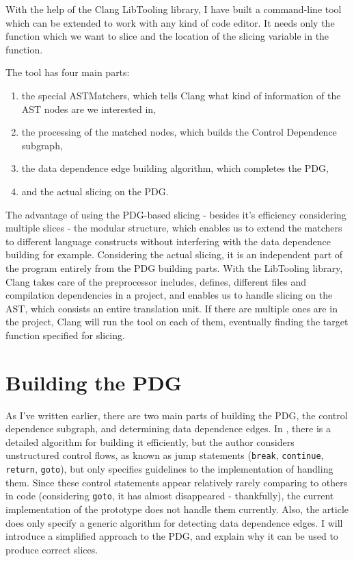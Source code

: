 \documentclass[oneside,12pt,a4paper]{book}
\begin{document}
With the help of the Clang LibTooling library, I have built a command-line tool which can be extended to work with any kind of code editor. It needs only the function which we want to slice and the location of the slicing variable in the function. 

The tool has four main parts: 
\begin{enumerate}
\item the special ASTMatchers, which tells Clang what kind of information of the AST nodes are we interested in,
\item the processing of the matched nodes, which builds the Control Dependence subgraph,
\item the data dependence edge building algorithm, which completes the PDG,
\item and the actual slicing on the PDG.
\end{enumerate}

The advantage of using the PDG-based slicing - besides it's efficiency considering multiple slices - the modular structure, which enables us to extend the matchers to different language constructs without interfering with the data dependence building for example. Considering the actual slicing, it is an independent part of the program entirely from the PDG building parts. With the LibTooling library, Clang takes care of the preprocessor includes, defines, different files and compilation dependencies in a project, and enables us to handle slicing on the AST, which consists an entire translation unit. If there are multiple ones are in the project, Clang will run the tool on each of them, eventually finding the target function specified for slicing.

\section{Building the PDG}

As I've written earlier, there are two main parts of building the PDG, the control dependence subgraph, and determining data dependence edges. In \cite{efficient-pdg}, there is a detailed algorithm for building it efficiently, but the author considers unstructured control flows, as known as jump statements (\texttt{break}, \texttt{continue}, \texttt{return}, \texttt{goto}), but only specifies guidelines to the implementation of handling them. Since these control statements appear relatively rarely comparing to others in code (considering \texttt{goto}, it has almost disappeared - thankfully), the current implementation of the prototype does not handle them currently.
Also, the article does only specify a generic algorithm for detecting data dependence edges. I will introduce a simplified approach to the PDG, and explain why it can be used to produce correct slices.
\end{document}
